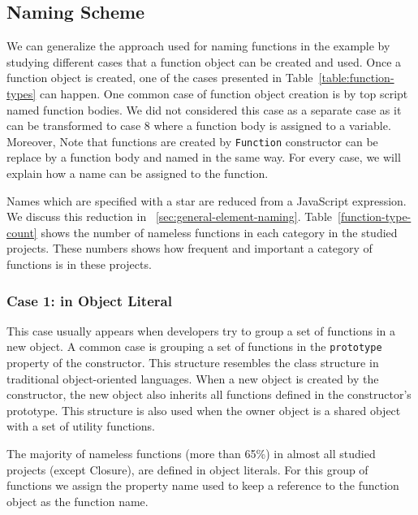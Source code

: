 \documentclass[10pt, preprint]{sigplanconf}
\begin{document}
\subsection{Naming Scheme}
We can generalize the approach used for naming functions in the example by studying different cases that a function object can be created and used. Once a function object is created, one of the cases presented in Table~\ref{table:function-types} can happen. One common case of function object creation is by top script named function bodies. We did not considered this case as a separate case as it can be transformed to case 8 where a function body is assigned to a variable. Moreover, Note that functions are created by {\small\texttt{Function}} constructor can be replace by a function body and named in the same way. For every case, we will explain how a name can be assigned to the function.


Names which are specified with a star are reduced from a JavaScript expression. We discuss this reduction in ~\ref{sec:general-element-naming}. Table~\ref{function-type-count} shows the number of nameless functions in each category in the studied projects. These numbers shows how frequent and important a category of functions is in these projects. 
  
\subsubsection{Case 1: in Object Literal}
 This case usually appears when developers try to group a set of functions in a new object. A common case is grouping a set of functions in the {\small\texttt{prototype}} property of the constructor. This structure resembles the class structure in traditional object-oriented languages. When a new object is created by the constructor, the new object also inherits all functions defined in the constructor's prototype. This structure is also used  when the owner object is a shared object with a set of utility functions.
 
 The majority of nameless functions (more than 65\%) in almost all studied projects (except Closure), are defined in object literals. For this group of functions we assign the property name used to keep a reference to the function object as the function name.     
 
\end{document}
